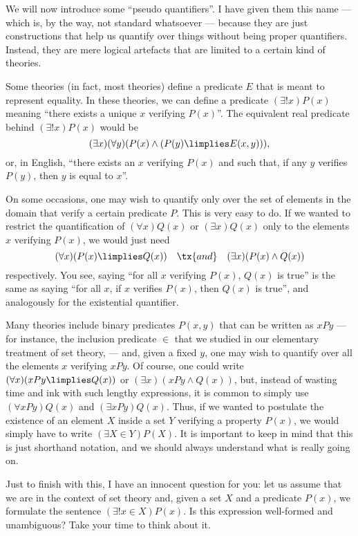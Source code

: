 \begin{para}
\label{pseudoquan}
We will now introduce some ``pseudo quantifiers''.
I have given them this name --- which is, by the way, not standard whatsoever --- because they are just constructions that help us quantify over things without being proper quantifiers.
Instead, they are mere logical artefacts that are limited to a certain kind of theories.

Some theories (in fact, most theories) define a predicate $E$ that is meant to represent equality. In these theories, we can define a predicate $(\exists! x)P(x)$ meaning ``there exists a unique $x$ verifying $P(x)$''. The equivalent real predicate behind $(\exists! x)P(x)$ would be
\[(\exists x)(\forall y) (P(x) \land (P(y)\limplies E(x,y))),\]
or, in English, ``there exists an $x$ verifying $P(x)$ and such that, if any $y$ verifies $P(y)$, then $y$ is equal to $x$''.

On some occasions, one may wish to quantify only over the set of elements in the domain that verify a certain predicate $P$.
This is very easy to do. If we wanted to restrict the quantification of $(\forall x)Q(x)$ or $(\exists x)Q(x)$ only to the elements $x$ verifying $P(x)$, we would just need
\[ (\forall x)(P(x)\limplies Q(x)) \quad \tx{and} \quad  (\exists x)(P(x) \land Q(x))\]
respectively.
You see, saying ``for all $x$ verifying $P(x)$, $Q(x)$ is true'' is the same as saying ``for all $x$, if $x$ verifies $P(x)$, then $Q(x)$ is true'', and analogously for the existential quantifier.

Many theories include binary predicates $P(x,y)$ that can be written as $xPy$ --- for instance, the inclusion predicate $\in$ that we studied in our elementary treatment of set theory, --- and, given a fixed $y$, one may wish to quantify over all the elements $x$ verifying $xPy$.
Of course, one could write $(\forall x)(xPy\limplies Q(x))$ or $(\exists x)(xPy\land Q(x))$, but, instead of wasting time and ink with such lengthy expressions, it is common to simply use $(\forall x P y)Q(x)$ and $(\exists x P y) Q(x)$.
Thus, if we wanted to postulate the existence of an element $X$ inside a set $Y$ verifying a property $P(x)$, we would simply have to write $(\exists X \in Y)P(X)$. 
It is important to keep in mind that this is just shorthand notation, and we should always understand what is really going on.

Just to finish with this, I have an innocent question for you: let us assume that we are in the context of set theory and, given a set $X$ and a predicate $P(x)$, we formulate the sentence $(\exists! x \in X) P(x)$.
Is this expression well-formed and unambiguous? Take your time to think about it.


\end{para}
